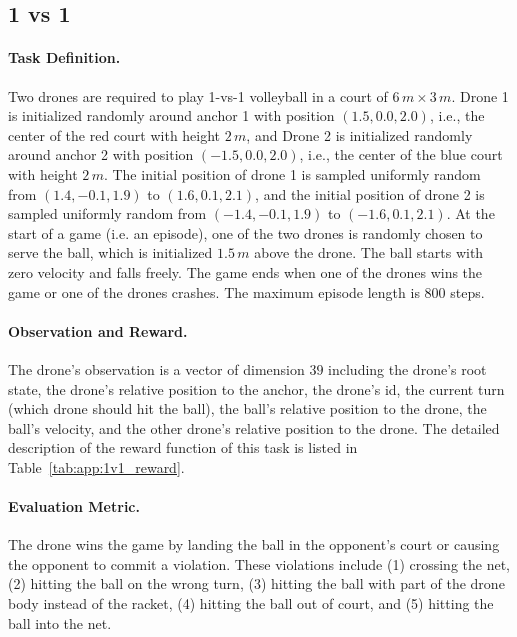 \subsection{1 vs 1}
\label{app:1v1}

\paragraph{Task Definition.}
Two drones are required to play 1-vs-1 volleyball in a court of $6\,m \times 3\,m$. Drone 1 is initialized randomly around anchor 1 with position $(1.5, 0.0, 2.0)$, i.e., the center of the red court with height $2\,m$, and Drone 2 is initialized randomly around anchor 2 with position $(-1.5, 0.0, 2.0)$, i.e., the center of the blue court with height $2\,m$. The initial position of drone 1 is sampled uniformly random from $(1.4, -0.1, 1.9)$ to $(1.6, 0.1, 2.1)$, and the initial position of drone 2 is sampled uniformly random from $(-1.4, -0.1, 1.9)$ to $(-1.6, 0.1, 2.1)$. At the start of a game (i.e. an episode), one of the two drones is randomly chosen to serve the ball, which is initialized $1.5\,m$ above the drone. The ball starts with zero velocity and falls freely. The game ends when one of the drones wins the game or one of the drones crashes. The maximum episode length is 800 steps.

\paragraph{Observation and Reward.}
The drone's observation is a vector of dimension $39$ including the drone's root state, the drone's relative position to the anchor, the drone's id, the current turn (which drone should hit the ball), the ball's relative position to the drone, the ball's velocity, and the other drone's relative position to the drone. The detailed description of the reward function of this task is listed in Table~\ref{tab:app:1v1_reward}.

\paragraph{Evaluation Metric.}
The drone wins the game by landing the ball in the opponent's court or causing the opponent to commit a violation. These violations include (1) crossing the net, (2) hitting the ball on the wrong turn, (3) hitting the ball with part of the drone body instead of the racket, (4) hitting the ball out of court, and (5) hitting the ball into the net.

